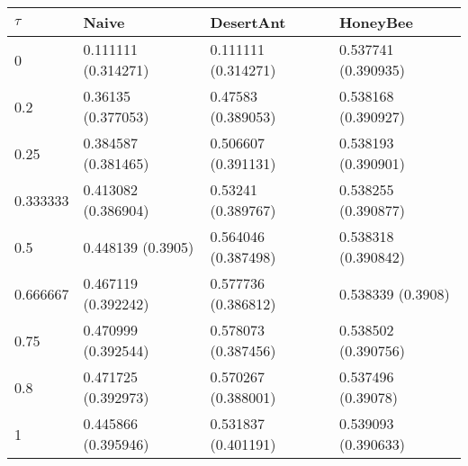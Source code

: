 \begin{tabular} {|l|l|l|l|}
\hline
$\tau$ & Naive & DesertAnt & HoneyBee \\
\hline
0 & 0.111111 (0.314271)  & 0.111111 (0.314271)  & 0.537741 (0.390935)  \\
0.2 & 0.36135 (0.377053)  & 0.47583 (0.389053)  & 0.538168 (0.390927)  \\
0.25 & 0.384587 (0.381465)  & 0.506607 (0.391131)  & 0.538193 (0.390901)  \\
0.333333 & 0.413082 (0.386904)  & 0.53241 (0.389767)  & 0.538255 (0.390877)  \\
0.5 & 0.448139 (0.3905)  & 0.564046 (0.387498)  & 0.538318 (0.390842)  \\
0.666667 & 0.467119 (0.392242)  & 0.577736 (0.386812)  & 0.538339 (0.3908)  \\
0.75 & 0.470999 (0.392544)  & 0.578073 (0.387456)  & 0.538502 (0.390756)  \\
0.8 & 0.471725 (0.392973)  & 0.570267 (0.388001)  & 0.537496 (0.39078)  \\
1 & 0.445866 (0.395946)  & 0.531837 (0.401191)  & 0.539093 (0.390633)  \\
\hline
\end{tabular}
